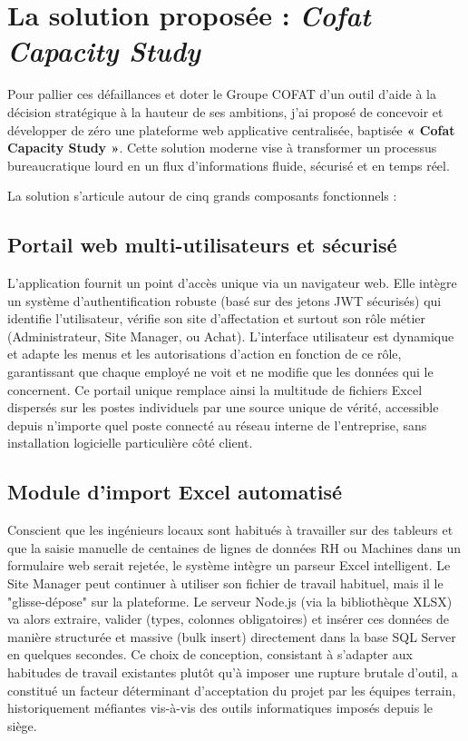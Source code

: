 \section{La solution proposée : \textit{Cofat Capacity Study}}
Pour pallier ces défaillances et doter le Groupe COFAT d'un outil d'aide à la décision stratégique à la hauteur de ses ambitions, j'ai proposé de concevoir et développer de zéro une plateforme web applicative centralisée, baptisée \textbf{« Cofat Capacity Study »}. Cette solution moderne vise à transformer un processus bureaucratique lourd en un flux d'informations fluide, sécurisé et en temps réel. 

La solution s'articule autour de cinq grands composants fonctionnels :

\subsection{Portail web multi-utilisateurs et sécurisé}
L'application fournit un point d'accès unique via un navigateur web. Elle intègre un système d'authentification robuste (basé sur des jetons JWT sécurisés) qui identifie l'utilisateur, vérifie son site d'affectation et surtout son rôle métier (Administrateur, Site Manager, ou Achat). L'interface utilisateur est dynamique et adapte les menus et les autorisations d'action en fonction de ce rôle, garantissant que chaque employé ne voit et ne modifie que les données qui le concernent. Ce portail unique remplace ainsi la multitude de fichiers Excel dispersés sur les postes individuels par une source unique de vérité, accessible depuis n'importe quel poste connecté au réseau interne de l'entreprise, sans installation logicielle particulière côté client.

\subsection{Module d'import Excel automatisé}
Conscient que les ingénieurs locaux sont habitués à travailler sur des tableurs et que la saisie manuelle de centaines de lignes de données RH ou Machines dans un formulaire web serait rejetée, le système intègre un parseur Excel intelligent. Le Site Manager peut continuer à utiliser son fichier de travail habituel, mais il le "glisse-dépose" sur la plateforme. Le serveur Node.js (via la bibliothèque XLSX) va alors extraire, valider (types, colonnes obligatoires) et insérer ces données de manière structurée et massive (bulk insert) directement dans la base SQL Server en quelques secondes. Ce choix de conception, consistant à s'adapter aux habitudes de travail existantes plutôt qu'à imposer une rupture brutale d'outil, a constitué un facteur déterminant d'acceptation du projet par les équipes terrain, historiquement méfiantes vis-à-vis des outils informatiques imposés depuis le siège.

